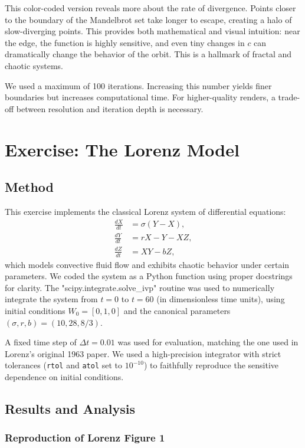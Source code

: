 \documentclass[12pt]{article}
\begin{document}
This color-coded version reveals more about the rate of divergence. Points closer to the boundary of the Mandelbrot set take longer to escape, creating a halo of slow-diverging points. This provides both mathematical and visual intuition: near the edge, the function is highly sensitive, and even tiny changes in \( c \) can dramatically change the behavior of the orbit. This is a hallmark of fractal and chaotic systems.

We used a maximum of 100 iterations. Increasing this number yields finer boundaries but increases computational time. For higher-quality renders, a trade-off between resolution and iteration depth is necessary.


\section{Exercise: The Lorenz Model}

\subsection*{Method}
This exercise implements the classical Lorenz system of differential equations:
\[
\begin{aligned}
\frac{dX}{dt} &= \sigma (Y - X), \\
\frac{dY}{dt} &= rX - Y - XZ, \\
\frac{dZ}{dt} &= XY - bZ,
\end{aligned}
\]
which models convective fluid flow and exhibits chaotic behavior under certain parameters. We coded the system as a Python function using proper docstrings for clarity. The "scipy.integrate.solve\_ivp" routine was used to numerically integrate the system from \( t = 0 \) to \( t = 60 \) (in dimensionless time units), using initial conditions \( W_0 = [0, 1, 0] \) and the canonical parameters \( (\sigma, r, b) = (10, 28, 8/3) \).

A fixed time step of \( \Delta t = 0.01 \) was used for evaluation, matching the one used in Lorenz's original 1963 paper. We used a high-precision integrator with strict tolerances (\texttt{rtol} and \texttt{atol} set to \( 10^{-10} \)) to faithfully reproduce the sensitive dependence on initial conditions.

\subsection*{Results and Analysis}

\subsubsection*{Reproduction of Lorenz Figure 1}
\end{document}
